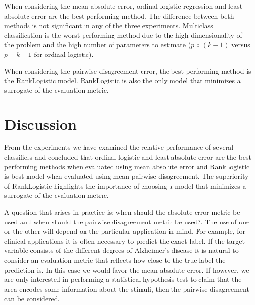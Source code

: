 When considering the mean absolute error, ordinal logistic regression and least absolute error are the best performing method. The difference between both methods is not significant in any of the three experiments. Multiclass classification is the worst performing method due to the high dimensionality of the problem and the high number of parameters to estimate ($p \times (k-1)$ versus $p + k - 1$ for ordinal logistic).

When considering the pairwise disagreement error, the best performing method is the RankLogistic model. RankLogistic is also the only model that minimizes a surrogate of the evaluation metric.


\section{Discussion}



From the experiments we have examined the relative performance of several classifiers and concluded that ordinal logistic and least absolute error are the best performing methods when evaluated using mean absolute error and RankLogistic is best model when evaluated using mean pairwise disagreement. The superiority of RankLogistic highlights the importance of choosing a model that minimizes a surrogate of the evaluation metric.


A question that arises in practice is: when should the absolute error metric be used and when should the pairwise disagreement metric be used?. The use of one or the other will depend on the particular application in mind. For example, for clinical applications it is often necessary to predict the exact label. If the target variable consists of the different degrees of Alzheimer's disease it is natural to consider an evaluation metric that reflects how close to the true label the prediction is. In this case we would favor the mean absolute error. If however, we are only interested in performing a statistical hypothesis test to claim that the area encodes some information about the stimuli,  then the pairwise disagreement can be considered. 

